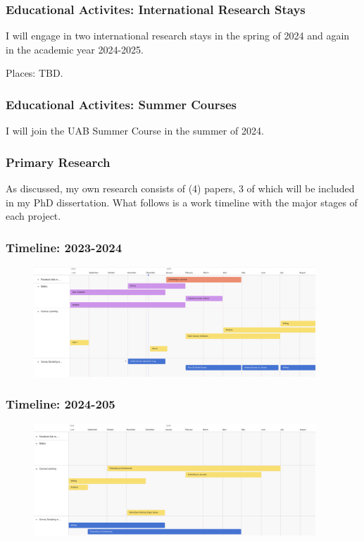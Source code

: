 \documentclass[aspectratio=169]{beamer}
\begin{document}
\begin{frame}
  \frametitle{Educational Activites: International Research Stays}

  I will engage in two international research stays in the spring of 2024 and again in the academic year 2024-2025.

  Places: TBD.

\end{frame}


\begin{frame}
  \frametitle{Educational Activites: Summer Courses}

  I will join the UAB Summer Course in the summer of 2024.

\end{frame}

\begin{frame}
  \frametitle{Primary Research}

  As discussed, my own research consists of (4) papers, 3 of which will be included in my PhD dissertation. What follows is a work timeline with the major stages of each project. 

\end{frame}

\begin{frame}
  \frametitle{Timeline: 2023-2024}

\begin{figure}[]
\includegraphics[width=400px]{resources/timeline-2024.png} 
\end{figure}    

\end{frame}


\begin{frame}
  \frametitle{Timeline: 2024-205}

\begin{figure}[]
\includegraphics[width=400px]{resources/timeline-2025.png} 
\end{figure}    

\end{frame}
\end{document}
